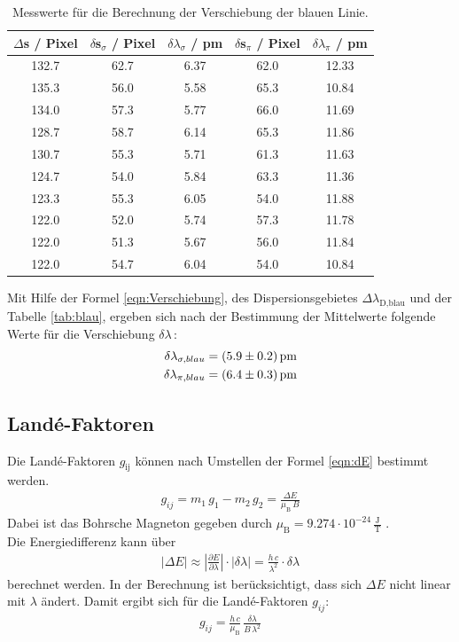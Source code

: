 \begin{table}[H]
  \centering
  \caption{Messwerte für die Berechnung der Verschiebung der blauen Linie.}
  \label{tab:blau}
  \begin{tabular}{c | c c | c c}
    $\Delta$s / Pixel & $\delta$s$_{\sigma}$ / Pixel & $\delta \lambda_{\sigma}$ / pm & $\delta$s$_{\pi}$ / Pixel & $\delta \lambda_{\pi}$ / pm \\
    \hline
    132.7 & 62.7 & 6.37 & 62.0 & 12.33 \\
    135.3 & 56.0 & 5.58 & 65.3 & 10.84 \\
    134.0 & 57.3 & 5.77 & 66.0 & 11.69 \\
    128.7 & 58.7 & 6.14 & 65.3 & 11.86 \\
    130.7 & 55.3 & 5.71 & 61.3 & 11.63 \\
    124.7 & 54.0 & 5.84 & 63.3 & 11.36 \\
    123.3 & 55.3 & 6.05 & 54.0 & 11.88 \\
    122.0 & 52.0 & 5.74 & 57.3 & 11.78 \\
    122.0 & 51.3 & 5.67 & 56.0 & 11.84 \\
    122.0 & 54.7 & 6.04 & 54.0 & 10.84 \\
    \hline
  \end{tabular}
\end{table}

Mit Hilfe der Formel \eqref{eqn:Verschiebung}, des Dispersionsgebietes $\Delta\lambda_\text{D,blau}$ und der Tabelle \eqref{tab:blau}, ergeben sich nach der Bestimmung der Mittelwerte folgende Werte für die Verschiebung $\delta\lambda$\,:
\begin{align*}
  \delta \lambda_{\sigma,blau} = (\num{5.9 +- 0.2})\,\text{pm} \\
  \delta \lambda_{\pi,blau} = (\num{6.4 +- 0.3})\,\text{pm}
\end{align*}



\subsection{Landé-Faktoren}
Die Landé-Faktoren $g_\text{ij}$ können nach Umstellen der Formel \eqref{eqn:dE} bestimmt werden.
\begin{align}
  g_{ij} = m_1\,g_1 - m_2\,g_2 = \frac{\Delta E}{\mu_\text{B}\,B}
\end{align}
Dabei ist das Bohrsche Magneton gegeben durch $\mu_\text{B} = 9.274 \cdot 10^{-24}\,\frac{\text{J}}{\text{T}}$ \cite{const}.\\
Die Energiedifferenz kann über
\begin{align}
  |\Delta E| \approx \left| \frac{\partial E}{\partial \lambda}\right| \cdot |\delta\lambda| = \frac{h\,c}{\lambda^2}\cdot \delta\lambda
\end{align}
berechnet werden. In der Berechnung ist berücksichtigt, dass sich $\Delta E$ nicht linear mit $\lambda$ ändert. Damit ergibt sich für die Landé-Faktoren $g_{ij}$:
\begin{align}
  g_{ij} = \frac{h\,c}{\mu_\text{B}}\,\frac{\delta\lambda}{B\,\lambda^2}
  \label{eqn:Landé}
\end{align}



